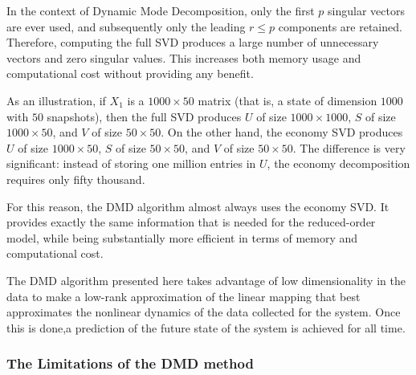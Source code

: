 \documentclass{article}
\begin{document}
In the context of Dynamic Mode Decomposition, only the first $p$ singular vectors are ever used, and subsequently only the leading $r \leq p$ components are retained. Therefore, computing the full SVD produces a large number of unnecessary vectors and zero singular values. This increases both memory usage and computational cost without providing any benefit.

As an illustration, if $X_1$ is a $1000 \times 50$ matrix (that is, a state of dimension $1000$ with $50$ snapshots), then the full SVD produces $U$ of size $1000 \times 1000$, $S$ of size $1000 \times 50$, and $V$ of size $50 \times 50$. On the other hand, the economy SVD produces $U$ of size $1000 \times 50$, $S$ of size $50 \times 50$, and $V$ of size $50 \times 50$. The difference is very significant: instead of storing one million entries in $U$, the economy decomposition requires only fifty thousand.

For this reason, the DMD algorithm almost always uses the economy SVD. It provides exactly the same information that is needed for the reduced-order model, while being substantially more efficient in terms of memory and computational cost.


\vspace{1cm}

The DMD algorithm presented here takes advantage of low dimensionality in the data to make a low-rank approximation of the linear mapping that best approximates the nonlinear dynamics of the data collected for the system. Once this is done,a prediction of the future state of the system is achieved for all time.

\vspace{1cm}

\subsubsection*{The Limitations of the DMD method}

\vspace{1cm}
\end{document}
